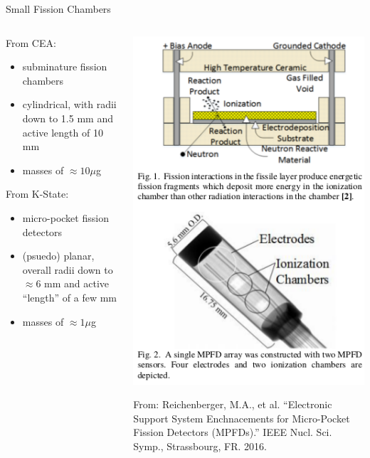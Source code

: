\documentclass[fleqn]{beamer}
\begin{document}
    \begin{frame}{Small Fission Chambers}
 
        \begin{columns}[c]
            \begin{column}{0.5\textwidth} %
              From CEA:
              \begin{itemize}
                \item subminature fission chambers
                \item cylindrical, with radii down to 1.5 mm and 
                      active length of 10 mm
                \item masses of $\approx 10\mu$g
              \end{itemize}
              From K-State:
              \begin{itemize}
                \item micro-pocket fission detectors 
                \item (psuedo) planar, overall radii down to $\approx 6$ mm
                      and active ``length'' of a few mm
                \item masses of $\approx 1\mu$g
              \end{itemize}
            \end{column}
            \begin{column}{0.5\textwidth} %
              \begin{center}
                \includegraphics[totalheight=.7\textheight]{mpfd}
              \end{center}
              \tiny  From: Reichenberger, M.A., et al. ``Electronic Support System 
                     Enchnacements for Micro-Pocket Fission Detectors (MPFDs).''
                     IEEE Nucl. Sci. Symp., Strassbourg, FR. 2016.
            \end{column}
        \end{columns}
    \end{frame}
\end{document}
